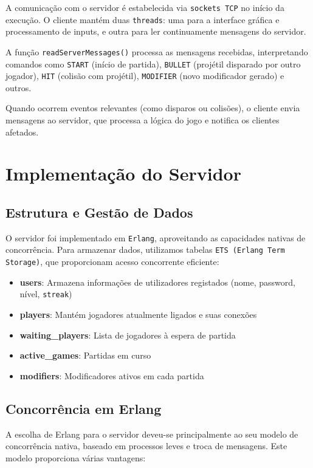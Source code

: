 \documentclass[12pt,a4paper]{report}
\begin{document}
A comunicação com o servidor é estabelecida via \texttt{sockets TCP} no início da execução. O cliente mantém duas \texttt{threads}: uma para a interface gráfica e processamento de inputs, e outra para ler continuamente mensagens do servidor.

A função \texttt{readServerMessages()} processa as mensagens recebidas, interpretando comandos como \texttt{START} (início de partida), \texttt{BULLET} (projétil disparado por outro jogador), \texttt{HIT} (colisão com projétil), \texttt{MODIFIER} (novo modificador gerado) e outros.

Quando ocorrem eventos relevantes (como disparos ou colisões), o cliente envia mensagens ao servidor, que processa a lógica do jogo e notifica os clientes afetados.

\chapter{Implementação do Servidor}

\section{Estrutura e Gestão de Dados}

O servidor foi implementado em \texttt{Erlang}, aproveitando as capacidades nativas de concorrência. Para armazenar dados, utilizamos tabelas \texttt{ETS (Erlang Term Storage)}, que proporcionam acesso concorrente eficiente:

\begin{itemize}
    \item \textbf{users}: Armazena informações de utilizadores registados (nome, password, nível, \texttt{streak})
    \item \textbf{players}: Mantém jogadores atualmente ligados e suas conexões
    \item \textbf{waiting\_players}: Lista de jogadores à espera de partida
    \item \textbf{active\_games}: Partidas em curso
    \item \textbf{modifiers}: Modificadores ativos em cada partida
\end{itemize}

\section{Concorrência em Erlang}

A escolha de Erlang para o servidor deveu-se principalmente ao seu modelo de concorrência nativa, baseado em processos leves e troca de mensagens. Este modelo proporciona várias vantagens:
\end{document}
